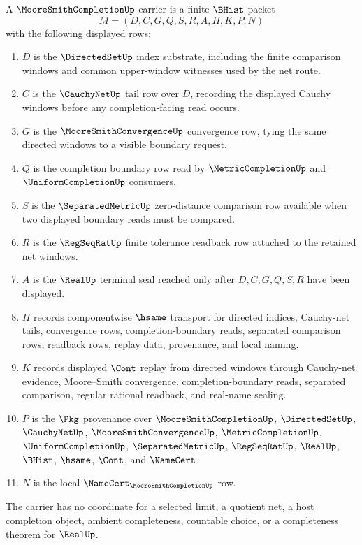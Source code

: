 \begin{definition}
\label{def:moore-smith-completion-carrier}
A $\MooreSmithCompletionUp$ carrier is a finite $\BHist$ packet
$$
M=(D,C,G,Q,S,R,A,H,K,P,N)
$$
with the following displayed rows:
\begin{enumerate}
\item $D$ is the $\DirectedSetUp$ index substrate, including the finite comparison windows and common upper-window witnesses used by the net route.
\item $C$ is the $\CauchyNetUp$ tail row over $D$, recording the displayed Cauchy windows before any completion-facing read occurs.
\item $G$ is the $\MooreSmithConvergenceUp$ convergence row, tying the same directed windows to a visible boundary request.
\item $Q$ is the completion boundary row read by $\MetricCompletionUp$ and $\UniformCompletionUp$ consumers.
\item $S$ is the $\SeparatedMetricUp$ zero-distance comparison row available when two displayed boundary reads must be compared.
\item $R$ is the $\RegSeqRatUp$ finite tolerance readback row attached to the retained net windows.
\item $A$ is the $\RealUp$ terminal seal reached only after $D,C,G,Q,S,R$ have been displayed.
\item $H$ records componentwise $\hsame$ transport for directed indices, Cauchy-net tails, convergence rows, completion-boundary reads, separated comparison rows, readback rows, replay data, provenance, and local naming.
\item $K$ records displayed $\Cont$ replay from directed windows through Cauchy-net evidence, Moore--Smith convergence, completion-boundary reads, separated comparison, regular rational readback, and real-name sealing.
\item $P$ is the $\Pkg$ provenance over $\MooreSmithCompletionUp$, $\DirectedSetUp$, $\CauchyNetUp$, $\MooreSmithConvergenceUp$, $\MetricCompletionUp$, $\UniformCompletionUp$, $\SeparatedMetricUp$, $\RegSeqRatUp$, $\RealUp$, $\BHist$, $\hsame$, $\Cont$, and $\NameCert$.
\item $N$ is the local $\NameCert_{\MooreSmithCompletionUp}$ row.
\end{enumerate}
The carrier has no coordinate for a selected limit, a quotient net, a host completion object, ambient completeness, countable choice, or a completeness theorem for $\RealUp$.
\end{definition}

